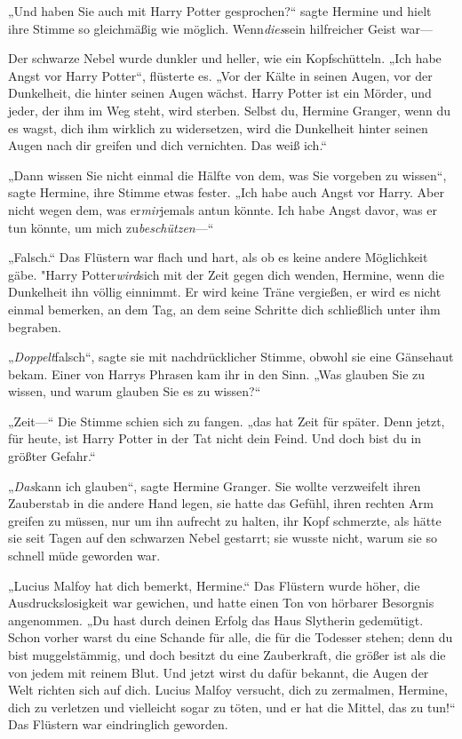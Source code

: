 {„Und haben Sie auch mit Harry Potter gesprochen?“ sagte Hermine und hielt ihre Stimme so gleichmäßig wie möglich. Wenn\emph{dies}sein hilfreicher Geist war—

Der schwarze Nebel wurde dunkler und heller, wie ein Kopfschütteln. „Ich habe Angst vor Harry Potter“, flüsterte es. „Vor der Kälte in seinen Augen, vor der Dunkelheit, die hinter seinen Augen wächst. Harry Potter ist ein Mörder, und jeder, der ihm im Weg steht, wird sterben. Selbst du, Hermine Granger, wenn du es wagst, dich ihm wirklich zu widersetzen, wird die Dunkelheit hinter seinen Augen nach dir greifen und dich vernichten. Das weiß ich.“

„Dann wissen Sie nicht einmal die Hälfte von dem, was Sie vorgeben zu wissen“, sagte Hermine, ihre Stimme etwas fester. „Ich habe auch Angst vor Harry. Aber nicht wegen dem, was er\emph{mir}jemals antun könnte. Ich habe Angst davor, was er tun könnte, um mich zu\emph{beschützen}—“

„Falsch.“ Das Flüstern war flach und hart, als ob es keine andere Möglichkeit gäbe. "Harry Potter\emph{wird}sich mit der Zeit gegen dich wenden, Hermine, wenn die Dunkelheit ihn völlig einnimmt. Er wird keine Träne vergießen, er wird es nicht einmal bemerken, an dem Tag, an dem seine Schritte dich schließlich unter ihm begraben.

„\emph{Doppelt}falsch“, sagte sie mit nachdrücklicher Stimme, obwohl sie eine Gänsehaut bekam. Einer von Harrys Phrasen kam ihr in den Sinn. „Was glauben Sie zu wissen, und warum glauben Sie es zu wissen?“

„Zeit—“ Die Stimme schien sich zu fangen. „das hat Zeit für später. Denn jetzt, für heute, ist Harry Potter in der Tat nicht dein Feind. Und doch bist du in größter Gefahr.“

„\emph{Das}kann ich glauben“, sagte Hermine Granger. Sie wollte verzweifelt ihren Zauberstab in die andere Hand legen, sie hatte das Gefühl, ihren rechten Arm greifen zu müssen, nur um ihn aufrecht zu halten, ihr Kopf schmerzte, als hätte sie seit Tagen auf den schwarzen Nebel gestarrt; sie wusste nicht, warum sie so schnell müde geworden war.

„Lucius Malfoy hat dich bemerkt, Hermine.“ Das Flüstern wurde höher, die Ausdruckslosigkeit war gewichen, und hatte einen Ton von hörbarer Besorgnis angenommen. „Du hast durch deinen Erfolg das Haus Slytherin gedemütigt. Schon vorher warst du eine Schande für alle, die für die Todesser stehen; denn du bist muggelstämmig, und doch besitzt du eine Zauberkraft, die größer ist als die von jedem mit reinem Blut. Und jetzt wirst du dafür bekannt, die Augen der Welt richten sich auf dich. Lucius Malfoy versucht, dich zu zermalmen, Hermine, dich zu verletzen und vielleicht sogar zu töten, und er hat die Mittel, das zu tun!“ Das Flüstern war eindringlich geworden.

}
